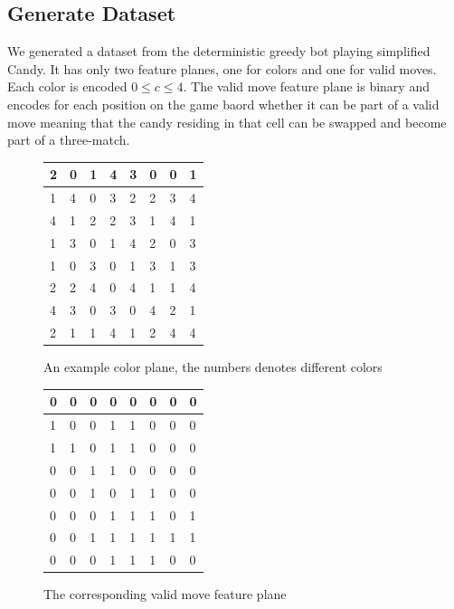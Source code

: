 \documentclass{kththesis}
\begin{document}
\subsection{Generate Dataset}
We generated a dataset from the deterministic greedy bot playing simplified Candy. It has only two feature planes, one for colors and one for valid moves. Each color is encoded $0 \leq c\leq 4$. The valid move feature plane is binary and encodes for each position on the game baord whether it can be part of a valid move meaning that the candy residing in that cell can be swapped and become part of a three-match.\\

\begin{figure}[!tbp]
  \centering
  \begin{minipage}[b]{0.4\textwidth}
\begin{tabular}{|l|l|l|l|l|l|l|l|}
\hline
2&0&1&4&3&0&0&1\\
\hline
1&4&0&3&2&2&3&4\\
\hline
4&1&2&2&3&1&4&1\\ 
\hline
1&3&0&1&4&2&0&3\\
\hline
1&0&3&0&1&3&1&3\\ 
\hline
2&2&4&0&4&1&1&4\\
\hline
4&3&0&3&0&4&2&1\\ 
\hline
2&1&1&4&1&2&4&4\\
\hline
\end{tabular}
    \caption{An example color plane, the numbers denotes different colors\\}
  \end{minipage}
  \hfill
  \begin{minipage}[b]{0.4\textwidth}
\begin{tabular}{|l|l|l|l|l|l|l|l|}
\hline
0& 0& 0& 0& 0& 0& 0& 0\\
\hline
1& 0& 0& 1& 1& 0& 0& 0 \\
\hline
1& 1& 0& 1& 1& 0& 0& 0\\
\hline
0& 0& 1& 1& 0& 0& 0& 0 \\
\hline
0& 0& 1& 0& 1& 1& 0& 0 \\
\hline
0& 0& 0& 1& 1& 1& 0& 1 \\
\hline
0& 0& 1& 1& 1& 1& 1& 1 \\
\hline
0& 0& 0& 1& 1& 1& 0& 0 \\
\hline
\end{tabular}
    \caption{The corresponding valid move feature plane}
  \end{minipage}
\end{figure}
\end{document}
